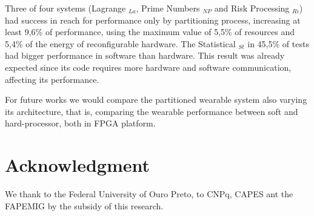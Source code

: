     Three of four systems (Lagrange \A$_{La}$, Prime Numbers  \A$_{NP}$ and Risk Processing \A$_{Ri}$) had success in reach for performance only by partitioning process, increasing at least 9,6\% of performance, using the maximum value of 5,5\% of resources and 5,4\% of the energy of reconfigurable hardware.
    The Statistical \Ss$_{St}$ in 45,5\% of tests had bigger performance in software than hardware.
    This result was already expected since its code requires more hardware and software communication, affecting its performance.

    For future works we would compare the partitioned wearable system also varying its architecture, that is, comparing the wearable performance between soft and hard-processor, both in FPGA platform.
    
    
    
    
    \section*{Acknowledgment}
        We thank to the Federal University of Ouro Preto, to CNPq, CAPES ant the FAPEMIG by the subsidy of this research.

